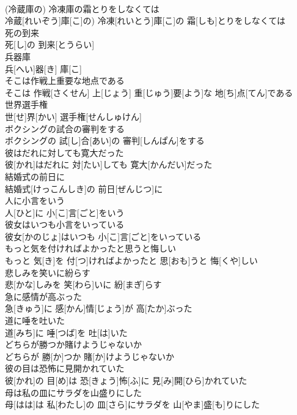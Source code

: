 \documentclass[8pt]{extreport}
\begin{document}
\begin{CJK}{UTF8}{min}
\\	(冷蔵庫の) 冷凍庫の霜とりをしなくては	
\\	冷蔵[れいぞう]庫[こ]の) 冷凍[れいとう]庫[こ]の 霜[しも]とりをしなくては
\\	死の到来	
\\	死[し]の 到来[とうらい]
\\	兵器庫	
\\	兵[へい]器[き] 庫[こ]
\\	そこは作戦上重要な地点である	
\\	そこは 作戦[さくせん] 上[じょう] 重[じゅう]要[よう]な 地[ち]点[てん]である
\\	世界選手権	
\\	世[せ]界[かい] 選手権[せんしゅけん]
\\	ボクシングの試合の審判をする	
\\	ボクシングの 試[し]合[あい]の 審判[しんぱん]をする
\\	彼はだれに対しても寛大だった	
\\	彼[かれ]はだれに 対[たい]しても 寛大[かんだい]だった
\\	結婚式の前日に	
\\	結婚式[けっこんしき]の 前日[ぜんじつ]に
\\	人に小言をいう	
\\	人[ひと]に 小[こ]言[ごと]をいう
\\	彼女はいつも小言をいっている	
\\	彼女[かのじょ]はいつも 小[こ]言[ごと]をいっている
\\	もっと気を付ければよかったと思うと悔しい	
\\	もっと 気[き]を 付[つ]ければよかったと 思[おも]うと 悔[くや]しい
\\	悲しみを笑いに紛らす	
\\	悲[かな]しみを 笑[わら]いに 紛[まぎ]らす
\\	急に感情が高ぶった	
\\	急[きゅう]に 感[かん]情[じょう]が 高[たか]ぶった
\\	道に唾を吐いた	
\\	道[みち]に 唾[つば]を 吐[は]いた
\\	どちらが勝つか賭けようじゃないか	
\\	どちらが 勝[か]つか 賭[か]けようじゃないか
\\	彼の目は恐怖に見開かれていた	
\\	彼[かれ]の 目[め]は 恐[きょう]怖[ふ]に 見[み]開[ひら]かれていた
\\	母は私の皿にサラダを山盛りにした	
\\	母[はは]は 私[わたし]の 皿[さら]にサラダを 山[やま]盛[も]りにした

\end{CJK}
\end{document}
